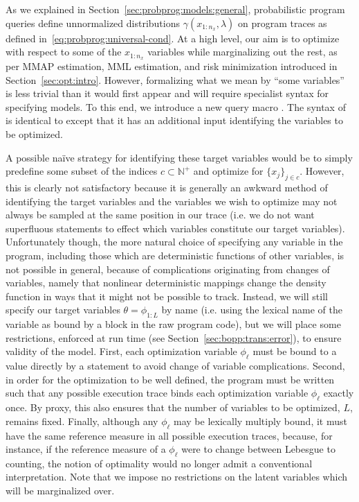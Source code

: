 
As we explained in Section~\ref{sec:probprog:models:general}, probabilistic program queries
define unnormalized distributions $\gamma(x_{1:n_x},\lambda)$ on program traces
 as defined in~\eqref{eq:probprog:universal-cond}.
At a high level, our aim is to optimize with respect to some of the $x_{1:n_x}$ variables while marginalizing out
the rest, as per MMAP estimation, MML estimation, and risk minimization introduced in
Section~\ref{sec:opt:intro}.
However, formalizing what we mean by ``some variables'' is less trivial than it would
first appear and will require specialist syntax for specifying models.  To this end,
we introduce a new query macro .  The syntax of  is identical to  except 
that it has an additional input identifying the variables to be optimized. 

A possible na\"{i}ve strategy for identifying these target variables
would be to simply predefine some subset of the \sample indices
$c \subset \mathbb{N}^+$ and optimize for $\{x_j \}_{j\in c}$.  However, this is clearly not satisfactory
because it is generally an awkward method of identifying the target variables and the variables we wish
to optimize may not always be sampled at the same position in our trace (i.e. we do not want superfluous
\sample statements to effect which variables constitute our target variables).
Unfortunately though, the more natural choice of specifying any variable in the program, including those
which are deterministic functions of other variables, is not possible in general, because of complications
originating from changes of variables, namely that nonlinear deterministic mappings change the density
function in ways that it might not be possible to track.  Instead, we will still specify our target variables
$\theta = \phi_{1:L}$ by name (i.e. using the lexical name of the variable as bound by a  block in
the raw program code), but we will place some restrictions, enforced at run time (see Section~\ref{sec:bopp:trans:error}), 
to ensure validity of the model.  First, each optimization variable $\phi_{\ell}$ must be bound to a value directly 
by a \sample statement to avoid change of variable complications.
Second, in order for the optimization to be well defined, the program must be written such that any 
possible execution trace binds each optimization variable $\phi_{\ell}$ exactly once.  By proxy, this also
ensures that the number of variables to be optimized, $L$, remains fixed.
Finally, although any $\phi_{\ell}$ may be lexically multiply bound, it must have the same reference 
measure in all possible execution traces, because, for instance, if the reference measure of 
a $\phi_{\ell}$ were to change between Lebesgue to counting, the notion of optimality would 
no longer admit a conventional interpretation.  Note that we impose no restrictions on the latent
variables which will be marginalized over.

